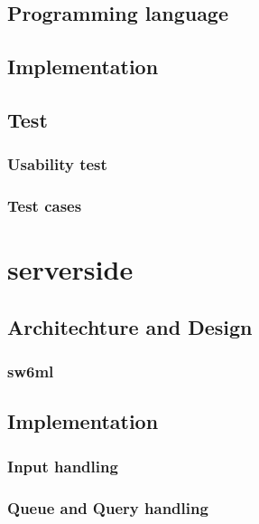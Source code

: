       \subsection{Programming language}
        
      \subsection{Implementation}
        
      \subsection{Test}
      \subsubsection{Usability test}
        
      \subsubsection{Test cases}
        

  \section{serverside} %
    
    \subsection{Architechture and Design}
      \label{sect:ssArchAndDesign}
	
      \subsubsection{sw6ml} %
	\label{sw6ml}
        
	  
    \subsection{Implementation}
      \subsubsection{Input handling} %
	
      \subsubsection{Queue and Query handling} %
	\label{QQHandling}
	  
